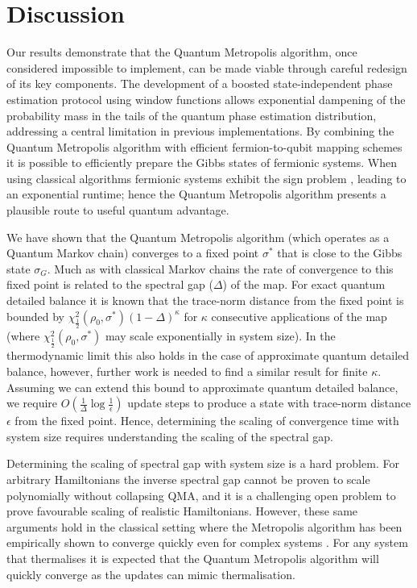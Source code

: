 \documentclass[aps,floatfix,10pt,amssymb,amsfont,amsmath,superscriptaddress,float,nofootinbib,longbibliography,nobalancelastpage,twocolumn]{revtex4-2}
\begin{document}
\section{Discussion}
\label{section:discussion}
Our results demonstrate that the Quantum Metropolis algorithm, once considered impossible to implement, can be made viable through careful redesign of its key components. The development of a boosted state-independent phase estimation protocol using window functions allows exponential dampening of the probability mass in the tails of the quantum phase estimation distribution, addressing a central limitation in previous implementations. By combining the Quantum Metropolis algorithm with efficient fermion-to-qubit mapping schemes \cite{jordan1928paulische,bravyi2002fermionic} it is possible to efficiently prepare the Gibbs states of fermionic systems. When using classical algorithms fermionic systems exhibit the sign problem \cite{troyer2005computational}, leading to an exponential runtime; hence the Quantum Metropolis algorithm presents a plausible route to useful quantum advantage.

We have shown that the Quantum Metropolis algorithm (which operates as a Quantum Markov chain) converges to a fixed point $\sigma^*$ that is close to the Gibbs state $\sigma_G$. Much as with classical Markov chains the rate of convergence to this fixed point is related to the spectral gap ($\Delta$) of the map. For exact quantum detailed balance it is known \cite{temme2010chi} that the trace-norm distance from the fixed point is bounded by $\chi^2_{\frac{1}{2}}(\rho_0,\sigma^*) (1-\Delta)^\kappa$ for $\kappa$ consecutive applications of the map (where $\chi^2_{\frac{1}{2}}(\rho_0,\sigma^*)$ may scale exponentially in system size). In the thermodynamic limit this also holds in the case of approximate quantum detailed balance, however, further work is needed to find a similar result for finite $\kappa$. Assuming we can extend this bound to approximate quantum detailed balance, we require $O(\frac{1}{\Delta}\log \frac{1}{\epsilon})$ update steps to produce a state with trace-norm distance $\epsilon$ from the fixed point. Hence, determining the scaling of convergence time with system size requires understanding the scaling of the spectral gap.

Determining the scaling of spectral gap with system size is a hard problem. For arbitrary Hamiltonians the inverse spectral gap cannot be proven to scale polynomially without collapsing QMA, and it is a challenging open problem to prove favourable scaling of realistic Hamiltonians. However, these same arguments hold in the classical setting where the Metropolis algorithm has been empirically shown to converge quickly even for complex systems \cite{landau2014guide}.  For any system that thermalises it is expected that the Quantum Metropolis algorithm will quickly converge as the updates can mimic thermalisation.
\end{document}
